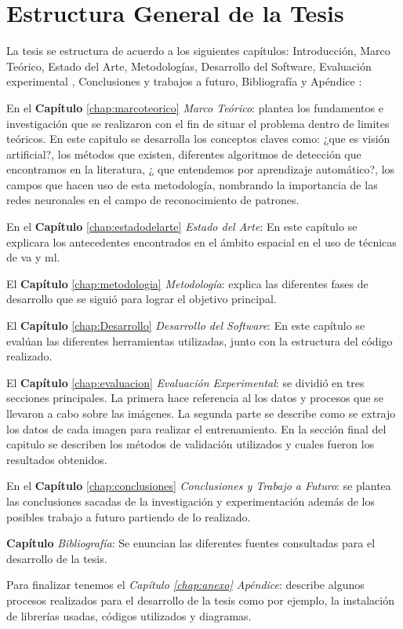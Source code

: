 \section{Estructura General de la Tesis }\label{sec:estructura}

La tesis se estructura de acuerdo a los siguientes capítulos: Introducción, Marco Teórico, Estado del Arte, Metodologías, Desarrollo del Software, Evaluación experimental , Conclusiones y trabajos a futuro, Bibliografía y Apéndice :

En el \textbf{Capítulo} \ref{chap:marcoteorico} \textit{Marco Teórico}: plantea los fundamentos e investigación que se realizaron con el fin de situar el problema dentro de limites teóricos. En este capitulo se desarrolla los conceptos claves como: ¿que es visión artificial?, los métodos que existen, diferentes algoritmos de detección que encontramos en la literatura, ¿ que entendemos por aprendizaje automático?, los campos que hacen uso de esta metodología, nombrando la importancia de las redes neuronales en el campo de reconocimiento de patrones.

En el \textbf{Capítulo} \ref{chap:estadodelarte} \textit{Estado del Arte}: En este capítulo se explicara los antecedentes encontrados en el ámbito espacial en el uso de técnicas de \ac{va} y \ac{ml}.

El \textbf{Capítulo} \ref{chap:metodologia} \textit{Metodología}: explica las diferentes fases de desarrollo que se siguió para lograr el objetivo principal.

El \textbf{Capítulo} \ref{chap:Desarrollo} \textit{Desarrollo del Software}: En este capítulo se evalúan las diferentes herramientas utilizadas, junto con la estructura del código realizado.

El \textbf{Capítulo} \ref{chap:evaluacion} \textit{Evaluación Experimental}:  se  dividió en tres secciones principales. La primera hace referencia al los datos y procesos que se llevaron a cabo sobre las imágenes. La segunda parte se describe como se extrajo los datos de cada imagen para realizar el entrenamiento. En la sección final del capitulo se describen los métodos de validación utilizados y cuales fueron los resultados obtenidos.

En el \textbf{Capítulo} \ref{chap:conclusiones} \textit{Conclusiones y Trabajo a Futuro}: se plantea las conclusiones sacadas de la investigación y experimentación además de los posibles trabajo a futuro partiendo de lo realizado.

\textbf{Capítulo} \textit{Bibliografía}: Se enuncian las diferentes fuentes consultadas para el desarrollo de la tesis.

Para finalizar tenemos el \textit{Capítulo \ref{chap:anexo} Apéndice}: describe algunos procesos realizados para el desarrollo de la tesis como por ejemplo, la instalación de librerías usadas, códigos utilizados y diagramas.
